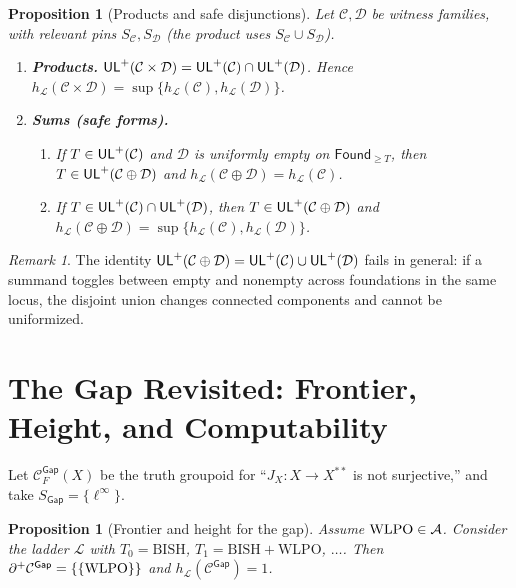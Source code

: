 \documentclass[11pt]{article}
\newtheorem{proposition}[theorem]{Proposition}
\theoremstyle{definition}
\theoremstyle{remark}
\newtheorem{remark}[theorem]{Remark}
\newcommand{\linf}{\ell^\infty}
\newcommand{\WLPO}{\mathrm{WLPO}}
\newcommand{\BISH}{\mathrm{BISH}}
\newcommand{\Found}{\mathsf{Found}}
\begin{document}
\begin{proposition}[Products and safe disjunctions]\label{p2:prop:prod-sum}
Let \(\mathcal C,\mathcal D\) be witness families, with relevant pins \(S_{\mathcal C},S_{\mathcal D}\) (the product uses \(S_{\mathcal C}\cup S_{\mathcal D}\)).
\begin{enumerate}
\item \textbf{Products.} \(\mathsf{UL}^{+}(\mathcal C\times\mathcal D)=\mathsf{UL}^{+}(\mathcal C)\cap\mathsf{UL}^{+}(\mathcal D)\). Hence \(h_{\mathcal L}(\mathcal C\times\mathcal D)=\sup\{h_{\mathcal L}(\mathcal C),h_{\mathcal L}(\mathcal D)\}\).
\item \textbf{Sums (safe forms).}
\begin{enumerate}
\item If \(T\in\mathsf{UL}^{+}(\mathcal C)\) and \(\mathcal D\) is \emph{uniformly empty} on \(\Found_{\ge T}\), then \(T\in\mathsf{UL}^{+}(\mathcal C\oplus\mathcal D)\) and \(h_{\mathcal L}(\mathcal C\oplus\mathcal D)=h_{\mathcal L}(\mathcal C)\).
\item If \(T\in\mathsf{UL}^{+}(\mathcal C)\cap\mathsf{UL}^{+}(\mathcal D)\), then \(T\in\mathsf{UL}^{+}(\mathcal C\oplus\mathcal D)\) and \(h_{\mathcal L}(\mathcal C\oplus\mathcal D)=\sup\{h_{\mathcal L}(\mathcal C),h_{\mathcal L}(\mathcal D)\}\).
\end{enumerate}
\end{enumerate}
\end{proposition}

\begin{remark}
The identity \(\mathsf{UL}^{+}(\mathcal C\oplus\mathcal D)=\mathsf{UL}^{+}(\mathcal C)\cup\mathsf{UL}^{+}(\mathcal D)\) fails in general:
if a summand toggles between empty and nonempty across foundations in the same locus, the disjoint union changes connected components and cannot be uniformized.
\end{remark}

\section{The Gap Revisited: Frontier, Height, and Computability}\label{p2:sec:gap}

Let \(\mathcal C^{\mathsf{Gap}}_F(X)\) be the truth groupoid for
``\(J_X:X\to X^{**}\) is not surjective,'' and take \(S_{\mathsf{Gap}}=\{\linf\}\).

\begin{proposition}[Frontier and height for the gap]\label{p2:prop:gap-frontier}
Assume \(\WLPO\in\Axis\). Consider the ladder \(\mathcal L\) with
\(T_0=\BISH\), \(T_1=\BISH+\WLPO\), \(\dots\).
Then \(\Frontierpos\mathcal C^{\mathsf{Gap}}=\{\{\WLPO\}\}\) and
\(h_{\mathcal L}(\mathcal C^{\mathsf{Gap}})=1\).
\end{proposition}
\end{document}
